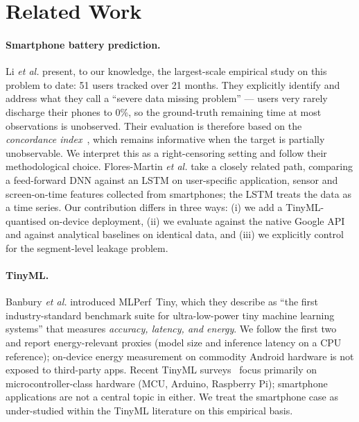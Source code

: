 \documentclass[conference]{IEEEtran}
\begin{document}
\section{Related Work}
\label{sec:related}
\paragraph{Smartphone battery prediction.}
Li \emph{et al.}\cite{li2018predicting} present, to our knowledge, the
largest-scale empirical study on this problem to date: 51 users tracked
over 21 months. They explicitly identify and address what they call
a ``severe data missing problem'' --- users very rarely discharge their
phones to 0\%, so the ground-truth remaining time at most observations
is unobserved. Their evaluation is therefore based on the
\emph{concordance index}~\cite{harrell1982evaluating}, which remains
informative when the target is partially unobservable. We interpret
this as a right-censoring setting and follow their methodological
choice. Flores-Martin \emph{et al.}\cite{floresmartin2024enhancing}
take a closely related path, comparing a feed-forward DNN against an
LSTM on user-specific application, sensor and screen-on-time
features collected from smartphones; the LSTM treats the data as a
time series. Our contribution differs in three ways: (i) we add a
TinyML-quantised on-device deployment, (ii) we evaluate against the
native Google API and against analytical baselines on identical data, and
(iii) we explicitly control for the segment-level leakage problem.

\paragraph{TinyML.}
Banbury \emph{et al.}\cite{banbury2021mlperf} introduced MLPerf~Tiny,
which they describe as ``the first industry-standard benchmark
suite for ultra-low-power tiny machine learning systems'' that
measures \emph{accuracy, latency, and energy}. We follow the first
two and report energy-relevant proxies (model size and inference
latency on a CPU reference); on-device energy measurement on
commodity Android hardware is not exposed to third-party apps.
Recent TinyML surveys~\cite{heydari2025tinyml,alajlan2022tinyml}
focus primarily on microcontroller-class hardware (MCU, Arduino,
Raspberry Pi); smartphone applications are not a central topic in
either. We treat the smartphone case as under-studied within the
TinyML literature on this empirical basis.
\end{document}
